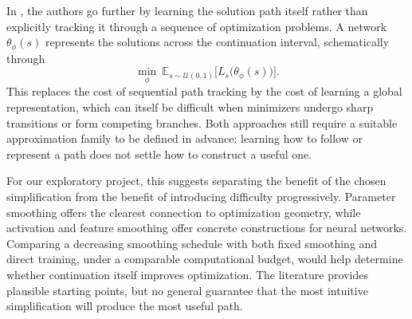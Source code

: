 \documentclass[11pt,a4paper]{article}
\begin{document}
In \cite{Lin2023ContinuationPL}, the authors go further by learning the
solution path itself rather than explicitly tracking it through a sequence
of optimization problems. A network $\theta_\phi(s)$ represents the
solutions across the continuation interval, schematically through
\[
    \min_\phi\ \mathbb{E}_{s\sim\mathcal{U}(0,1)}
    \bigl[L_s\bigl(\theta_\phi(s)\bigr)\bigr].
\]
This replaces the cost of sequential path tracking by the cost of learning
a global representation, which can itself be difficult when minimizers
undergo sharp transitions or form competing branches. Both approaches
still require a suitable approximation family to be defined in advance:
learning how to follow or represent a path does not settle how to
construct a useful one.

For our exploratory project, this suggests separating the benefit of the
chosen simplification from the benefit of introducing difficulty
progressively. Parameter smoothing offers the clearest connection to
optimization geometry, while activation and feature smoothing offer
concrete constructions for neural networks. Comparing a decreasing
smoothing schedule with both fixed smoothing and direct training, under
a comparable computational budget, would help determine whether
continuation itself improves optimization. The literature provides
plausible starting points, but no general guarantee that the most
intuitive simplification will produce the most useful path.



\end{document}
